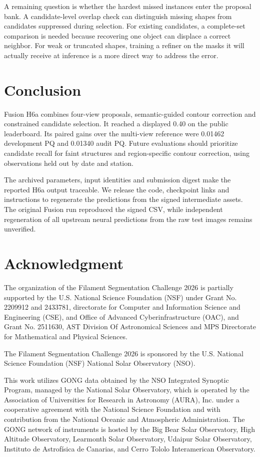 \documentclass[sigconf]{acmart}
\begin{document}
A remaining question is whether the hardest missed instances enter the proposal bank. A candidate-level overlap check can distinguish missing shapes from candidates suppressed during selection. For existing candidates, a complete-set comparison is needed because recovering one object can displace a correct neighbor. For weak or truncated shapes, training a refiner on the masks it will actually receive at inference is a more direct way to address the error.

\section{Conclusion}
Fusion H6a combines four-view proposals, semantic-guided contour correction and constrained candidate selection. It reached a displayed 0.40 on the public leaderboard. Its paired gains over the multi-view reference were 0.01462 development PQ and 0.01340 audit PQ. Future evaluations should prioritize candidate recall for faint structures and region-specific contour correction, using observations held out by date and station.

The archived parameters, input identities and submission digest make the reported H6a output traceable. We release the code, checkpoint links and instructions to regenerate the predictions from the signed intermediate assets. The original Fusion run reproduced the signed CSV, while independent regeneration of all upstream neural predictions from the raw test images remains unverified.

\section{Acknowledgment}\label{sec:acknowledgment}
The organization of the Filament Segmentation Challenge 2026 is partially supported by the U.S. National Science Foundation (NSF) under Grant No. 2209912 and 2433781, directorate for Computer and Information Science and Engineering (CSE), and Office of Advanced Cyberinfrastructure (OAC), and Grant No. 2511630, AST Division Of Astronomical Sciences and MPS Directorate for Mathematical and Physical Sciences.

The Filament Segmentation Challenge 2026 is sponsored by the U.S. National Science Foundation (NSF) National Solar Observatory (NSO).

This work utilizes GONG data obtained by the NSO Integrated Synoptic Program, managed by the National Solar Observatory, which is operated by the Association of Universities for Research in Astronomy (AURA), Inc. under a cooperative agreement with the National Science Foundation and with contribution from the National Oceanic and Atmospheric Administration. The GONG network of instruments is hosted by the Big Bear Solar Observatory, High Altitude Observatory, Learmonth Solar Observatory, Udaipur Solar Observatory, Instituto de Astrofísica de Canarias, and Cerro Tololo Interamerican Observatory.
\end{document}

